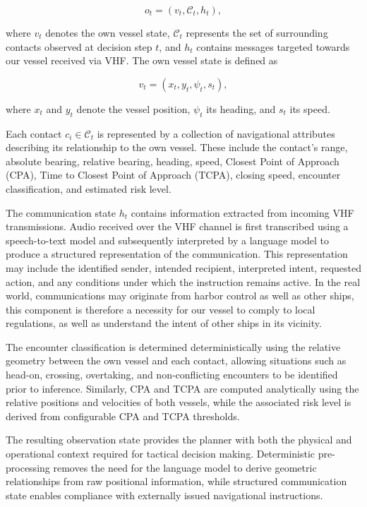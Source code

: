 \documentclass[10pt]{reportMaster}
\begin{document}
\begin{equation}
    o_t = (v_t, \mathcal{C}_t, h_t),
\end{equation}

where $v_t$ denotes the own vessel state, $\mathcal{C}_t$ represents the set of surrounding contacts observed at decision step $t$, and $h_t$ contains messages targeted towards our vessel received via VHF. The own vessel state is defined as

\begin{equation}
v_t = (x_t, y_t, \psi_t, s_t),
\end{equation}

where $x_t$ and $y_t$ denote the vessel position, $\psi_t$ its heading, and $s_t$ its speed.

Each contact $c_i \in \mathcal{C}_t$ is represented by a collection of navigational attributes describing its relationship to the own vessel. These include the contact's range, absolute bearing, relative bearing, heading, speed, Closest Point of Approach (CPA), Time to Closest Point of Approach (TCPA), closing speed, encounter classification, and estimated risk level.

The communication state $h_t$ contains information extracted from incoming VHF transmissions. Audio received over the VHF channel is first transcribed using a speech-to-text model and subsequently interpreted by a language model to produce a structured representation of the communication. This representation may include the identified sender, intended recipient, interpreted intent, requested action, and any conditions under which the instruction remains active. In the real world, communications may originate from harbor control as well as other ships, this component is therefore a necessity for our vessel to comply to local regulations, as well as understand the intent of other ships in its vicinity.

The encounter classification is determined deterministically using the relative geometry between the own vessel and each contact, allowing situations such as head-on, crossing, overtaking, and non-conflicting encounters to be identified prior to inference. Similarly, CPA and TCPA are computed analytically using the relative positions and velocities of both vessels, while the associated risk level is derived from configurable CPA and TCPA thresholds.

The resulting observation state provides the planner with both the physical and operational context required for tactical decision making. Deterministic pre-processing removes the need for the language model to derive geometric relationships from raw positional information, while structured communication state enables compliance with externally issued navigational instructions.
\end{document}

